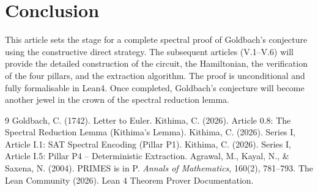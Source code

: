 \documentclass[11pt,a4paper]{article}
\begin{document}
\section{Conclusion}

This article sets the stage for a complete spectral proof of Goldbach's conjecture using the constructive direct strategy. The subsequent articles (V.1–V.6) will provide the detailed construction of the circuit, the Hamiltonian, the verification of the four pillars, and the extraction algorithm. The proof is unconditional and fully formalisable in Lean4. Once completed, Goldbach's conjecture will become another jewel in the crown of the spectral reduction lemma.


\begin{thebibliography}{9}
  Goldbach, C. (1742). Letter to Euler.
  Kithima, C. (2026). Article 0.8: The Spectral Reduction Lemma (Kithima's Lemma).
  Kithima, C. (2026). Series I, Article I.1: SAT Spectral Encoding (Pillar P1).
  Kithima, C. (2026). Series I, Article I.5: Pillar P4 – Deterministic Extraction.
  Agrawal, M., Kayal, N., \& Saxena, N. (2004). PRIMES is in P. \emph{Annals of Mathematics}, 160(2), 781–793.
  The Lean Community (2026). Lean 4 Theorem Prover Documentation.
\end{thebibliography}
\end{document}
